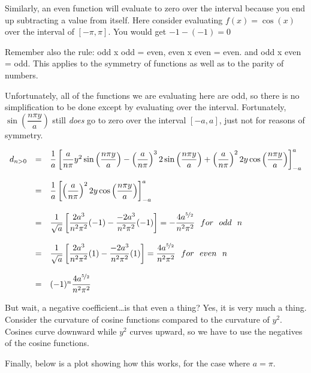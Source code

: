 \documentclass[12pt, openany, letterpaper]{memoir}
\begin{document}
Similarly, an even function will evaluate to zero over the interval because you end up subtracting a value from itself. Here consider evaluating $f(x) = \cos(x)$ over the interval of $[-\pi,\pi]$. You would get $-1 - (-1) = 0$

Remember also the rule: odd x odd = even, even x even = even. and odd x even = odd. This applies to the symmetry of functions as well as to the parity of numbers.

Unfortunately, all of the functions we are evaluating here are odd, so there is no simplification to be done except by evaluating over the interval. Fortunately, $\sin\left(\dfrac{n\pi y}{a}\right)$ still \emph{does} go to zero over the interval $[-a,a]$, just not for reasons of symmetry.

\begin{equation*}
\begin{array}{rcl}
	d_{n>0}	&=&\dfrac{1}{a}\left[\dfrac{a}{n\pi}y^2\sin{\left(\dfrac{n\pi y}{a}\right)} - \left(\dfrac{a}{n\pi}\right)^3 2\sin{\left(\dfrac{n\pi y}{a}\right)}+\left(\dfrac{a}{n\pi}\right)^2 2y \cos{\left(\dfrac{n\pi y}{a}\right)}\right]_{-a}^{a}\\ \\
	& = & \dfrac{1}{a}\left[\left(\dfrac{a}{n\pi}\right)^2 2y \cos{\left(\dfrac{n\pi y}{a}\right)}\right]_{-a}^{a}\\ \\
	
	& = & \dfrac{1}{\sqrt{a}}\left[\dfrac{2a^3}{n^2\pi^2}(-1) - \dfrac{-2a^3}{n^2\pi^2}(-1)\right] = - \dfrac{4a^{\nicefrac{5}{2}}}{n^2\pi^2} ~~ for ~~ odd ~~n\\ \\
	& = & \dfrac{1}{\sqrt{a}}\left[\dfrac{2a^3}{n^2\pi^2}(1) - \dfrac{-2a^3}{n^2\pi^2}(1)\right] = \dfrac{4a^{\nicefrac{5}{2}}}{n^2\pi^2} ~~ for ~~ even ~~n\\ \\
	& = & (-1)^n\dfrac{4a^{\nicefrac{5}{2}}}{n^2\pi^2}
\end{array}
\end{equation*}


But wait, a negative coefficient\ldots is that even a thing? Yes, it is very much a thing. Consider the curvature of cosine functions compared to the curvature of $y^2$. Cosines curve downward while $y^2$ curves upward, so we have to use the negatives of the cosine functions.

Finally, below is a plot showing how this works, for the case where $a=\pi$. 
\end{document}
